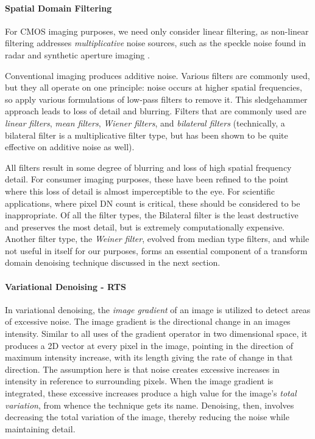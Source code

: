 \documentclass[10pt]{article}
\begin{document}
\paragraph{Spatial Domain Filtering}

For CMOS imaging purposes, we need only consider linear filtering, as non-linear filtering addresses \emph{multiplicative} noise sources, such as the speckle noise found in radar and synthetic aperture imaging \cite{jebur23}. 

Conventional imaging produces additive noise. Various filters are commonly used, but they all operate on one principle: noise occurs at higher spatial frequencies, so apply various formulations of low-pass filters to remove it. This sledgehammer approach leads to loss of detail and blurring. Filters that are commonly used are \emph{linear filters}, \emph{mean filters},  \emph{Wiener filters}, and \emph{bilateral filters} (technically, a bilateral filter is a multiplicative filter type, but has been shown to be quite effective on additive noise as well). 

All filters result in some degree of blurring and loss of high spatial frequency detail. For consumer imaging purposes, these have been refined to the point where this loss of detail is almost imperceptible to the eye. For scientific applications, where pixel DN count is critical, these should be considered to be inappropriate. Of all the filter types, the Bilateral filter \cite{tomasi98} is the least destructive and preserves the most detail, but is extremely computationally expensive. Another filter type, the \emph{Weiner filter}, evolved from median type filters, and while not useful in itself for our purposes, forms an essential component of a transform domain denoising technique discussed in the next section.

\paragraph{Variational Denoising - RTS}
\label{sec:RTS}

In variational denoising, the \emph{image gradient} of an image is utilized to detect areas of excessive noise. The image gradient is the directional change in an images intensity. Similar to all uses of the gradient operator in two dimensional space, it produces a 2D vector at every pixel in the image, pointing in the direction of maximum intensity increase, with its length giving the rate of change in that direction. The assumption here is that noise creates excessive increases in intensity in reference to surrounding pixels. When the image gradient is integrated, these excessive increases produce a high value for the image's \emph{total variation}, from whence the technique gets its name. Denoising, then, involves decreasing the total variation of the image, thereby reducing the noise while maintaining detail. 
\end{document}
